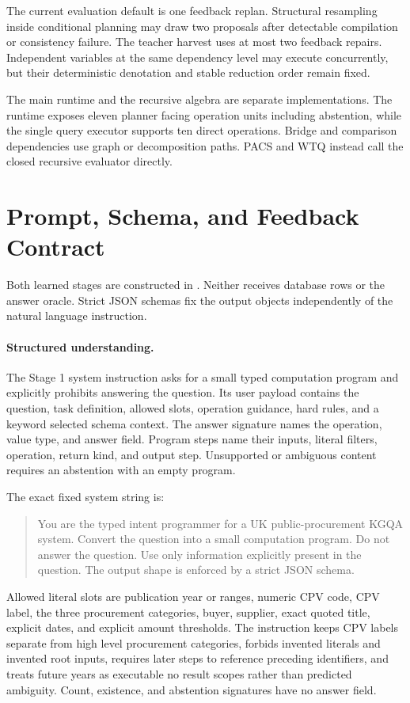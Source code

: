 \documentclass{article}
\begin{document}
The current evaluation default is one feedback replan.  Structural resampling inside conditional
planning may draw two proposals after detectable compilation or consistency failure.  The teacher
harvest uses at most two feedback repairs.  Independent variables at the same dependency level may
execute concurrently, but their deterministic denotation and stable reduction order remain fixed.

The main runtime and the recursive algebra are separate implementations.  The runtime exposes
eleven planner facing operation units including abstention, while the single query executor supports
ten direct operations.  Bridge and comparison dependencies use graph or decomposition paths.  PACS
and WTQ instead call the closed recursive evaluator directly.

\section{Prompt, Schema, and Feedback Contract}
\label{app:prompts}

Both learned stages are constructed in
.  Neither receives database rows or the
answer oracle.  Strict JSON schemas fix the output objects independently of the natural language
instruction.

\paragraph{Structured understanding.}
The Stage 1 system instruction asks for a small typed computation program and explicitly prohibits
answering the question.  Its user payload contains the question, task definition, allowed slots,
operation guidance, hard rules, and a keyword selected schema context.  The answer signature names
the operation, value type, and answer field.  Program steps name their inputs, literal filters,
operation, return kind, and output step.  Unsupported or ambiguous content requires an abstention
with an empty program.

The exact fixed system string is:
\begin{quote}\small
You are the typed intent programmer for a UK public-procurement KGQA system. Convert the question
into a small computation program. Do not answer the question. Use only information explicitly
present in the question. The output shape is enforced by a strict JSON schema.
\end{quote}

Allowed literal slots are publication year or ranges, numeric CPV code, CPV label, the three
procurement categories, buyer, supplier, exact quoted title, explicit dates, and explicit amount
thresholds.  The instruction keeps CPV labels separate from high level procurement categories,
forbids invented literals and invented root inputs, requires later steps to reference preceding
identifiers, and treats future years as executable no result scopes rather than predicted
ambiguity.  Count, existence, and abstention signatures have no answer field.
\end{document}
